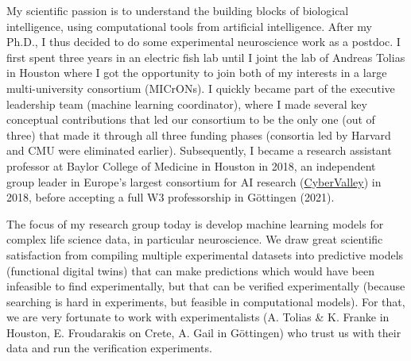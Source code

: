 \documentclass[COG,11pt]{ercgrant}
\begin{document}
My scientific passion is to understand the building blocks of biological intelligence, using computational tools from artificial intelligence. After my Ph.D., I thus decided to do some experimental neuroscience work as a postdoc. I first spent three years in an electric fish lab until I joint the lab of Andreas Tolias in Houston where I got the opportunity to join both of my interests in a large multi-university consortium (MICrONs). I quickly became part of the executive leadership team (machine learning coordinator), where I made several key conceptual contributions that led our consortium to be the only one (out of three) that made it through all three funding phases (consortia led by Harvard and CMU were eliminated earlier). Subsequently, I became a research assistant professor at Baylor College of Medicine in Houston in 2018, an independent group leader in Europe's largest consortium for AI research  (\href{https://cyber-valley.de/}{CyberValley}) in 2018, before accepting a full W3 professorship in Göttingen (2021).

The focus of my research group today is develop machine learning models for complex life science data, in particular neuroscience. We draw great scientific satisfaction from compiling multiple experimental datasets into predictive models (functional digital twins) that can make predictions which would have been infeasible to find experimentally, but that can be verified experimentally (because searching is hard in experiments, but feasible in computational models). For that, we are very fortunate to work with experimentalists (A. Tolias \& K. Franke in Houston, E. Froudarakis on Crete, A. Gail in Göttingen) who trust us with their data and run the verification experiments.
\end{document}
